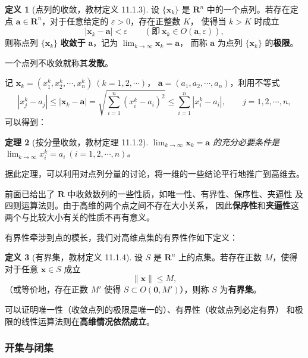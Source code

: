 \documentclass[11pt]{ctexart}
\theoremstyle{plain}
\newtheorem{thm}{定理}[section]
\theoremstyle{definition}
\newtheorem{defn}[thm]{定义}
\theoremstyle{remark}
\begin{document}
\begin{defn}[点列的收敛，教材定义 11.1.3]\label{def:seqconv}
设 \(\{\boldsymbol{x}_k\}\) 是 \(\mathbf{R}^n\) 中的一个点列。若存在定点
\(\boldsymbol{a}\in\mathbf{R}^n\)，对于任意给定的 \(\varepsilon>0\)，存在正整数 \(K\)，
使得当 \(k>K\) 时成立
\[
  |\boldsymbol{x}_k-\boldsymbol{a}|<\varepsilon
  \qquad(\text{即}\ \boldsymbol{x}_k\in O(\boldsymbol{a},\varepsilon)),
\]
则称点列 \(\{\boldsymbol{x}_k\}\) \textbf{收敛于} \(\boldsymbol{a}\)，记为
\(\displaystyle\lim_{k\to\infty}\boldsymbol{x}_k=\boldsymbol{a}\)，
而称 \(\boldsymbol{a}\) 为点列 \(\{\boldsymbol{x}_k\}\) 的\textbf{极限}。

一个点列不收敛就称其\textbf{发散}。
\end{defn}

记 \(\boldsymbol{x}_k=(x_1^k,x_2^k,\cdots,x_n^k)\ (k=1,2,\cdots)\)，
\(\boldsymbol{a}=(a_1,a_2,\cdots,a_n)\)，利用不等式
\[
  |x_j^k-a_j|\le|\boldsymbol{x}_k-\boldsymbol{a}|
  =\sqrt{\sum_{i=1}^{n}(x_i^k-a_i)^2}
  \le\sum_{i=1}^{n}|x_i^k-a_i|,\qquad j=1,2,\cdots,n,
\]
可以得到：

\begin{thm}[按分量收敛，教材定理 11.1.2]\label{thm:component}
\(\displaystyle\lim_{k\to\infty}\boldsymbol{x}_k=\boldsymbol{a}\) 的充分必要条件是
\(\displaystyle\lim_{k\to\infty}x_i^k=a_i\ (i=1,2,\cdots,n)\)。
\end{thm}

据此定理，可以利用对点列分量的讨论，将一维的一些结论平行地推广到高维去。

前面已给出了 \(\mathbf{R}\) 中收敛数列的一些性质，如唯一性、有界性、保序性、夹逼性
及四则运算法则。由于高维的两个点之间不存在大小关系，
因此\textbf{保序性}和\textbf{夹逼性}这两个与比较大小有关的性质不再有意义。

有界性牵涉到点的模长，我们对高维点集的有界性作如下定义：

\begin{defn}[有界集，教材定义 11.1.4]\label{def:bounded}
设 \(S\) 是 \(\mathbf{R}^n\) 上的点集。若存在正数 \(M\)，使得对于任意
\(\boldsymbol{x}\in S\) 成立
\[
  \|\boldsymbol{x}\|\le M,
\]
（或等价地，存在正数 \(M'\) 使得 \(S\subset O(\boldsymbol{0},M')\)），则称 \(S\) 为\textbf{有界集}。
\end{defn}

可以证明唯一性（收敛点列的极限是唯一的）、有界性（收敛点列必定有界）
和极限的线性运算法则在\textbf{高维情况依然成立}。

\subsubsection{开集与闭集}
\end{document}
